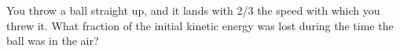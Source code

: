 You throw a ball straight up, and it lands with 2/3 the speed with which you threw it.
What fraction of the initial kinetic energy was lost
during the time the ball was in the air?\answercheck
